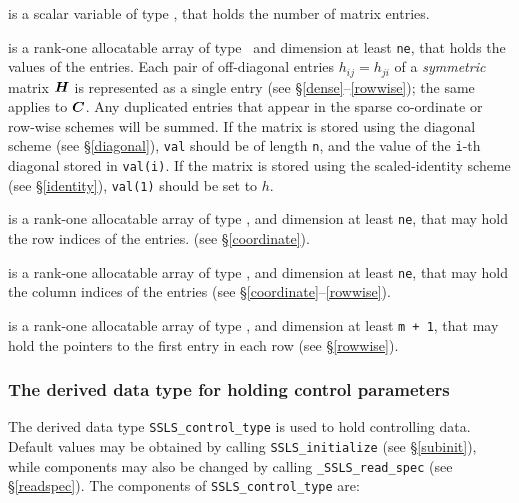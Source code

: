 \documentclass{galahad}
\newcommand{\packagename}{SSLS}
\newcommand{\fullpackagename}{\libraryname\_\packagename}
\begin{document}
\begin{description}
 is a scalar variable of type \integer, that
holds the number of matrix entries.

 is a rank-one allocatable array of type \realdp\,
and dimension at least {\tt ne}, that holds the values of the entries.
Each pair of off-diagonal entries $h_{ij} = h_{ji}$ of a {\em symmetric}
matrix ${\bm{H}}$ is represented as a single entry
(see \S\ref{dense}--\ref{rowwise}); the same applies to ${\bm{C}}$.
Any duplicated entries that appear in the sparse
co-ordinate or row-wise schemes will be summed.
If the matrix is stored using the diagonal scheme (see \S\ref{diagonal}),
{\tt val} should be of length {\tt n}, and the value of the {\tt i}-th
diagonal stored in {\tt val(i)}.
If the matrix is stored using the scaled-identity scheme (see \S\ref{identity}),
{\tt val(1)} should be set to $h$.

 is a rank-one allocatable array of type \integer,
and dimension at least {\tt ne}, that may hold the row indices of the entries.
(see \S\ref{coordinate}).

 is a rank-one allocatable array of type \integer,
and dimension at least {\tt ne}, that may hold the column indices of the entries
(see \S\ref{coordinate}--\ref{rowwise}).

 is a rank-one allocatable array of type \integer,
and dimension at least {\tt m + 1}, that may hold the pointers to
the first entry in each row (see \S\ref{rowwise}).

\end{description}



\subsubsection{The derived data type for holding control
 parameters}\label{typecontrol}
The derived data type
{\tt \packagename\_control\_type}
is used to hold controlling data. Default values may be obtained by calling
{\tt \packagename\_initialize}
(see \S\ref{subinit}),
while components may also be changed by calling
{\tt \fullpackagename\_read\-\_spec}
(see \S\ref{readspec}).
The components of
{\tt \packagename\_control\_type}
are:
\end{document}
